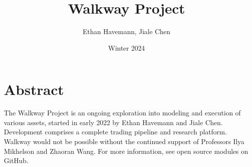 \documentclass{article}
\title{Walkway Project}
\author{Ethan Havemann, Jiale Chen}
\date{Winter 2024}
\begin{document}
\maketitle

\section*{Abstract}
The Walkway Project is an ongoing exploration into modeling and execution of various assets, started in early 2022 by Ethan Havemann and Jiale Chen. Development comprises a complete trading pipeline and research platform. Walkway would not be possible without the continued support of Professors Ilya Mikhelson and Zhaoran Wang. For more information, see open source modules on GitHub. 
\end{document}
